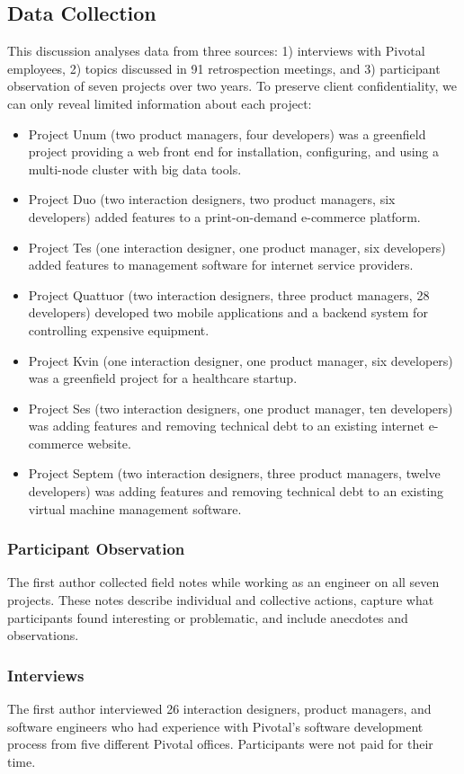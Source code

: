 \subsection{Data Collection}
This discussion analyses data from three sources: 1) interviews with Pivotal employees, 2) topics discussed in 91 retrospection meetings, and 3) participant observation of seven projects over two years. To preserve client confidentiality, we can only reveal limited information about each project:

\begin{itemize}
\item Project Unum (two product managers, four developers) was a greenfield project providing a web front end for installation, configuring, and using a multi-node cluster with big data tools. 
\item Project Duo (two interaction designers, two product managers, six developers) added features to a print-on-demand e-commerce platform. 
\item Project Tes (one interaction designer, one product manager, six developers) added features to management software for internet service providers.
\item Project Quattuor (two interaction designers, three product managers, 28 developers) developed two mobile applications and a backend system for controlling expensive equipment.
\item Project Kvin (one interaction designer, one product manager, six developers) was a greenfield project for a healthcare startup. 
\item Project Ses (two interaction designers, one product manager, ten developers) was adding features and removing technical debt to an existing internet e-commerce website.
\item Project Septem (two interaction designers, three product managers, twelve developers) was adding features and removing technical debt to an existing virtual machine management software.
\end{itemize}
\subsubsection{Participant Observation}
The first author collected field notes while working as an engineer on all seven projects. These notes describe individual and collective actions, capture what participants found interesting or problematic, and include anecdotes and observations.
\subsubsection{Interviews}
The first author interviewed 26 interaction designers, product managers, and software engineers who had experience with Pivotal's software development process from five different Pivotal offices. Participants were not paid for their time.

